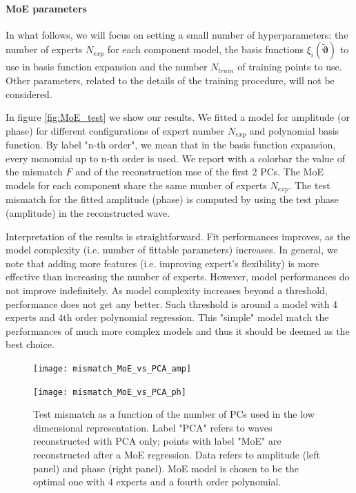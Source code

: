\paragraph{MoE parameters}
In what follows, we will focus on setting a small number of hyperparameters: the number of experts $N_{exp}$ for each component model, the basis functions $\xi_i(\boldsymbol{\tilde{\vartheta}})$ to use in basis function expansion and the number $N_{train}$ of training points to use.
Other parameters, related to the details of the training procedure, will not be considered.
\par
In figure \ref{fig:MoE_test} we show our results.
We fitted a model for amplitude (or phase) for different configurations of expert number $N_{exp}$ and polynomial basis function.
By label "n-th order", we mean that in the basis function expansion, every monomial up to n-th order is used.
We report with a colorbar the value of the mismatch $F$ and of the reconstruction mse of the first 2 PCs. The MoE models for each component share the same number of experts $N_{exp}$.
The test mismatch for the fitted amplitude (phase) is computed by using the test phase (amplitude) in the reconstructed wave.
\par
Interpretation of the results is straightforward. Fit performances improves, as the model complexity (i.e. number of fittable parameters) increases.
In general, we note that adding more features (i.e. improving expert's flexibility) is more effective than increasing the number of experts.
However, model performances do not improve indefinitely. As model complexity increases beyond a threshold, performance does not get any better.
Such threshold is around a model with 4 experts and 4th order polynomial regression. This "simple" model match the performances of much more complex models and thus it should be deemed as the best choice.
\begin{figure}[!t]
	\centering 
    \begin{minipage}{.5\linewidth}
		\centering
	    \texttt{[image: mismatch\_MoE\_vs\_PCA\_amp]}
	\end{minipage}\hfill
    \begin{minipage}{.5\linewidth}
		\centering
	    \texttt{[image: mismatch\_MoE\_vs\_PCA\_ph]}
	\end{minipage}
	\caption{Test mismatch as a function of the number of PCs used in the low dimensional representation.
Label "PCA" refers to waves reconstructed with PCA only; points with label "MoE" are reconstructed after a MoE regression.
Data refers to amplitude (left panel) and phase (right panel).
MoE model is chosen to be the optimal one with $4$ experts and a fourth order polynomial.
}
	\label{fig:mismatch_MoE_vs_PCA}
\end{figure}
